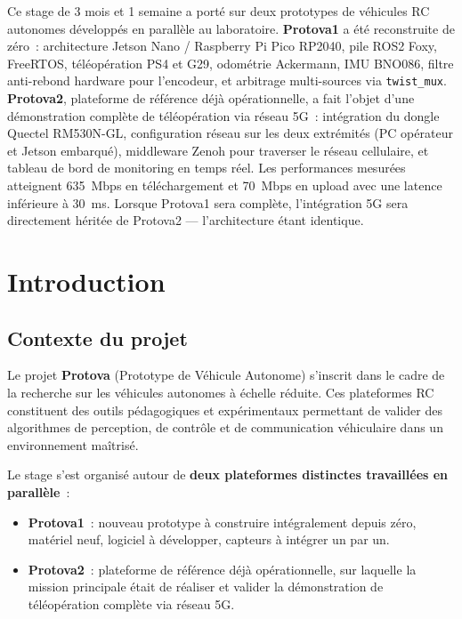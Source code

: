 \documentclass[a4paper,11pt]{article}
\begin{document}
\newpage
\begin{tcolorbox}[colback=lightblue, colframe=primary, title={\textbf{Résumé}}]
Ce stage de 3 mois et 1 semaine a porté sur deux prototypes de véhicules RC autonomes
développés en parallèle au laboratoire. \textbf{Protova1} a été reconstruite de zéro~:
architecture Jetson Nano / Raspberry Pi Pico RP2040, pile ROS2 Foxy, FreeRTOS, téléopération
PS4 et G29, odométrie Ackermann, IMU BNO086, filtre anti-rebond hardware pour l'encodeur, et
arbitrage multi-sources via \texttt{twist\_mux}. \textbf{Protova2}, plateforme de référence déjà
opérationnelle, a fait l'objet d'une démonstration complète de téléopération via réseau 5G~:
intégration du dongle Quectel RM530N-GL, configuration réseau sur les deux extrémités (PC
opérateur et Jetson embarqué), middleware Zenoh pour traverser le réseau cellulaire, et
tableau de bord de monitoring en temps réel. Les performances mesurées atteignent 635~Mbps
en téléchargement et 70~Mbps en upload avec une latence inférieure à 30~ms. Lorsque
Protova1 sera complète, l'intégration 5G sera directement héritée de Protova2 — l'architecture
étant identique.
\end{tcolorbox}

\tableofcontents
\newpage

\section{Introduction}

\subsection{Contexte du projet}

Le projet \textbf{Protova} (Prototype de Véhicule Autonome) s'inscrit dans le cadre
de la recherche sur les véhicules autonomes à échelle réduite. Ces plateformes RC
constituent des outils pédagogiques et expérimentaux permettant de valider des
algorithmes de perception, de contrôle et de communication véhiculaire dans un
environnement maîtrisé.

Le stage s'est organisé autour de \textbf{deux plateformes distinctes travaillées
en parallèle}~:

\begin{itemize}
  \item \textbf{Protova1}~: nouveau prototype à construire intégralement depuis zéro,
        matériel neuf, logiciel à développer, capteurs à intégrer un par un.
  \item \textbf{Protova2}~: plateforme de référence déjà opérationnelle, sur laquelle
        la mission principale était de réaliser et valider la démonstration de
        téléopération complète via réseau 5G.
\end{itemize}
\end{document}

